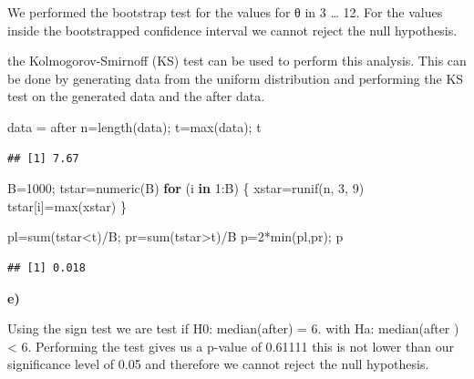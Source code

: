 \documentclass[
]{article}
\newenvironment{Shaded}{\begin{snugshade}}{\end{snugshade}}
\newcommand{\ControlFlowTok}[1]{\textcolor[rgb]{0.13,0.29,0.53}{\textbf{#1}}}
\newcommand{\DecValTok}[1]{\textcolor[rgb]{0.00,0.00,0.81}{#1}}
\newcommand{\FunctionTok}[1]{\textcolor[rgb]{0.00,0.00,0.00}{#1}}
\newcommand{\NormalTok}[1]{#1}
\newcommand{\OtherTok}[1]{\textcolor[rgb]{0.56,0.35,0.01}{#1}}
\newcommand{\SpecialCharTok}[1]{\textcolor[rgb]{0.00,0.00,0.00}{#1}}
\begin{document}
We performed the bootstrap test for the values for θ in 3 \ldots{} 12.
For the values inside the bootstrapped confidence interval we cannot
reject the null hypothesis.

the Kolmogorov-Smirnoff (KS) test can be used to perform this analysis.
This can be done by generating data from the uniform distribution and
performing the KS test on the generated data and the after data.

\begin{Shaded}
\begin{Highlighting}[]
\NormalTok{data }\OtherTok{=}\NormalTok{ after}
\NormalTok{n}\OtherTok{=}\FunctionTok{length}\NormalTok{(data); t}\OtherTok{=}\FunctionTok{max}\NormalTok{(data); t}
\end{Highlighting}
\end{Shaded}

\begin{verbatim}
## [1] 7.67
\end{verbatim}

\begin{Shaded}
\begin{Highlighting}[]
\NormalTok{B}\OtherTok{=}\DecValTok{1000}\NormalTok{; tstar}\OtherTok{=}\FunctionTok{numeric}\NormalTok{(B)}
\ControlFlowTok{for}\NormalTok{ (i }\ControlFlowTok{in} \DecValTok{1}\SpecialCharTok{:}\NormalTok{B) \{}
\NormalTok{  xstar}\OtherTok{=}\FunctionTok{runif}\NormalTok{(n, }\DecValTok{3}\NormalTok{, }\DecValTok{9}\NormalTok{)}
\NormalTok{  tstar[i]}\OtherTok{=}\FunctionTok{max}\NormalTok{(xstar)}
\NormalTok{\}}

\NormalTok{pl}\OtherTok{=}\FunctionTok{sum}\NormalTok{(tstar}\SpecialCharTok{\textless{}}\NormalTok{t)}\SpecialCharTok{/}\NormalTok{B;}
\NormalTok{pr}\OtherTok{=}\FunctionTok{sum}\NormalTok{(tstar}\SpecialCharTok{\textgreater{}}\NormalTok{t)}\SpecialCharTok{/}\NormalTok{B}
\NormalTok{p}\OtherTok{=}\DecValTok{2}\SpecialCharTok{*}\FunctionTok{min}\NormalTok{(pl,pr); p}
\end{Highlighting}
\end{Shaded}

\begin{verbatim}
## [1] 0.018
\end{verbatim}

\textbf{e)}

Using the sign test we are test if H0: median(after) = 6. with Ha:
median(after ) \textless{} 6. Performing the test gives us a p-value of
0.61111 this is not lower than our significance level of 0.05 and
therefore we cannot reject the null hypothesis.
\end{document}
